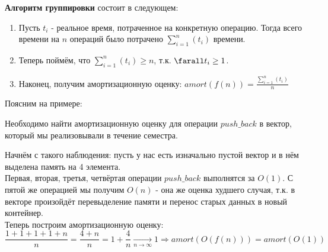 \textbf{Алгоритм группировки} состоит в следующем:
\begin{enumerate}
    \item Пусть $t_i$ - реальное время, потраченное на конкретную операцию. Тогда всего времени на $n$ операций было потрачено $\sum\limits_{i = 1}^n (t_i)$ времени.
    \item Теперь поймём, что $\sum\limits_{i = 1}^n (t_i) \geq n$, т.к. $\farall t_i \geq 1$.
    \item Наконец, получим амортизационную оценку: $amort(f(n)) = \frac{\sum\limits_{i = 1}^n (t_i)}{n}$
\end{enumerate}
Поясним на примере:
\begin{problem}
Необходимо найти амортизационную оценку для операции $push\_back$ в вектор, который мы реализовывали в течение семестра.
\end{problem}
\begin{claim}
    Начнём с такого наблюдения: пусть у нас есть изначально пустой вектор и в нём выделена память на 4 элемента.\\
    Первая, вторая, третья, четвёртая операции $push\_back$ выполнятся за $O(1)$. С пятой же операцией мы получим $O(n)$ - она же оценка худшего случая, т.к. в векторе произойдёт перевыделение памяти и перенос старых данных в новый контейнер.\\
    Теперь построим амортизационную оценку:
    $$
    \frac{1+1+1+1+n}{n} = \frac{4 + n}{n} = 1 + \frac{4}{n} \xrightarrow[n\rightarrow\infty]{}1\Rightarrow amort(O(f(n))) = amort(O(1))
    $$
\end{claim}





